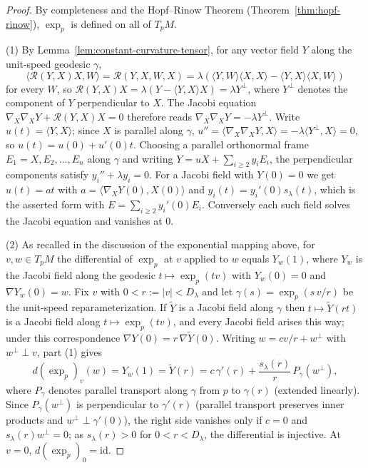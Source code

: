 \begin{proof}
\sketch
{}
By completeness and the Hopf--Rinow Theorem
(Theorem~\ref{thm:hopf-rinow}), $\exp_p$ is defined on all of
$T_pM$.

(1) By Lemma~\ref{lem:constant-curvature-tensor}, for any vector
field $Y$ along the unit-speed geodesic $\gamma$,
$$\langle{\mathcal R}(Y,X)X,W\rangle={\mathcal R}(Y,X,W,X)
=\lambda\left(\langle Y,W\rangle\langle X,X\rangle
-\langle Y,X\rangle\langle X,W\rangle\right)$$
for every $W$, so ${\mathcal R}(Y,X)X=\lambda\left(Y-\langle
Y,X\rangle X\right)=\lambda Y^\perp$, where $Y^\perp$ denotes the
component of $Y$ perpendicular to $X$. The Jacobi equation
$\nabla_X\nabla_XY+{\mathcal R}(Y,X)X=0$ therefore reads
$\nabla_X\nabla_XY=-\lambda Y^\perp$. Write $u(t)=\langle
Y,X\rangle$; since $X$ is parallel along $\gamma$,
$u''=\langle\nabla_X\nabla_XY,X\rangle=-\lambda\langle
Y^\perp,X\rangle=0$, so $u(t)=u(0)+u'(0)t$. Choosing a parallel
orthonormal frame $E_1=X,E_2,\ldots,E_n$ along $\gamma$ and writing
$Y=uX+\sum_{i\ge 2}y_iE_i$, the perpendicular components satisfy
$y_i''+\lambda y_i=0$. For a Jacobi field with $Y(0)=0$ we get
$u(t)=at$ with $a=\langle \nabla_XY(0),X(0)\rangle$ and
$y_i(t)=y_i'(0)s_\lambda(t)$, which is the asserted form with
$E=\sum_{i\ge2}y_i'(0)E_i$. Conversely each such field solves the
Jacobi equation and vanishes at $0$.

(2) As recalled in the discussion of the exponential mapping above,
for $v,w\in T_pM$ the differential of $\exp_p$ at $v$
applied to $w$ equals $Y_w(1)$, where $Y_w$ is the Jacobi field
along the geodesic $t\mapsto\exp_p(tv)$ with $Y_w(0)=0$ and
$\nabla Y_w(0)=w$. Fix $v$ with $0<r:=|v|<D_\lambda$ and let
$\gamma(s)=\exp_p(s\,v/r)$ be the unit-speed reparameterization. If
$\widetilde Y$ is a Jacobi field along $\gamma$ then
$t\mapsto\widetilde Y(rt)$ is a Jacobi field along
$t\mapsto\exp_p(tv)$, and every Jacobi field arises this way; under
this correspondence $\nabla Y(0)=r\,\nabla\widetilde Y(0)$.
Writing $w=cv/r+w^\perp$ with $w^\perp\perp v$, part (1) gives
\begin{equation}\label{dexpformula}
d(\exp_p)_v(w)=Y_w(1)=\widetilde Y(r)
=c\,\gamma'(r)+\frac{s_\lambda(r)}{r}\,P_\gamma(w^\perp),
\end{equation}
where $P_\gamma$ denotes parallel transport along $\gamma$ from $p$
to $\gamma(r)$ (extended linearly). Since $P_\gamma(w^\perp)$ is
perpendicular to $\gamma'(r)$ (parallel transport preserves inner
products and $w^\perp\perp\gamma'(0)$), the right side vanishes only
if $c=0$ and $s_\lambda(r)w^\perp=0$; as $s_\lambda(r)>0$ for
$0<r<D_\lambda$, the differential is injective. At $v=0$,
$d(\exp_p)_0=\mathrm{id}$.


\end{proof}
